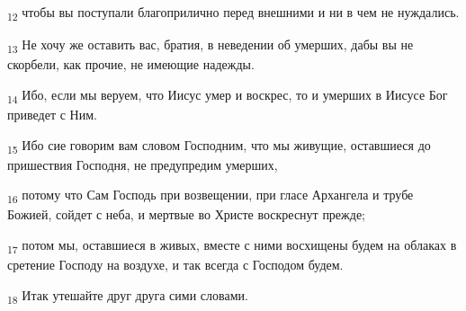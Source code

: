 \begin{tcolorbox}
\textsubscript{12} чтобы вы поступали благоприлично перед внешними и ни в чем не нуждались.
\end{tcolorbox}
\begin{tcolorbox}
\textsubscript{13} Не хочу же оставить вас, братия, в неведении об умерших, дабы вы не скорбели, как прочие, не имеющие надежды.
\end{tcolorbox}
\begin{tcolorbox}
\textsubscript{14} Ибо, если мы веруем, что Иисус умер и воскрес, то и умерших в Иисусе Бог приведет с Ним.
\end{tcolorbox}
\begin{tcolorbox}
\textsubscript{15} Ибо сие говорим вам словом Господним, что мы живущие, оставшиеся до пришествия Господня, не предупредим умерших,
\end{tcolorbox}
\begin{tcolorbox}
\textsubscript{16} потому что Сам Господь при возвещении, при гласе Архангела и трубе Божией, сойдет с неба, и мертвые во Христе воскреснут прежде;
\end{tcolorbox}
\begin{tcolorbox}
\textsubscript{17} потом мы, оставшиеся в живых, вместе с ними восхищены будем на облаках в сретение Господу на воздухе, и так всегда с Господом будем.
\end{tcolorbox}
\begin{tcolorbox}
\textsubscript{18} Итак утешайте друг друга сими словами.
\end{tcolorbox}
